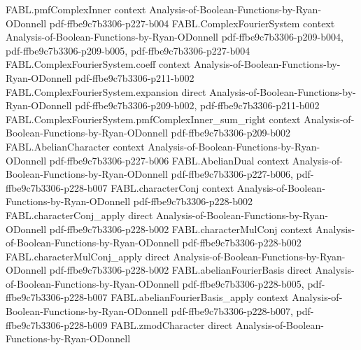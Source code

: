 \begin{theorem}
\label{FABL.ComplexFourierSystem.coeff_eq_inner}
\leanok
{}
\proofstep
  {FABL.pmfComplexInner}
  {context}
  {Analysis-of-Boolean-Functions-by-Ryan-ODonnell}
  {pdf-ffbe9c7b3306-p227-b004}
\proofstep
  {FABL.ComplexFourierSystem}
  {context}
  {Analysis-of-Boolean-Functions-by-Ryan-ODonnell}
  {pdf-ffbe9c7b3306-p209-b004,
    pdf-ffbe9c7b3306-p209-b005,
    pdf-ffbe9c7b3306-p227-b004}
\proofstep
  {FABL.ComplexFourierSystem.coeff}
  {context}
  {Analysis-of-Boolean-Functions-by-Ryan-ODonnell}
  {pdf-ffbe9c7b3306-p211-b002}
\proofstep
  {FABL.ComplexFourierSystem.expansion}
  {direct}
  {Analysis-of-Boolean-Functions-by-Ryan-ODonnell}
  {pdf-ffbe9c7b3306-p209-b002,
    pdf-ffbe9c7b3306-p211-b002}
\proofstep
  {FABL.ComplexFourierSystem.pmfComplexInner_sum_right}
  {context}
  {Analysis-of-Boolean-Functions-by-Ryan-ODonnell}
  {pdf-ffbe9c7b3306-p209-b002}
\proofstep
  {FABL.AbelianCharacter}
  {context}
  {Analysis-of-Boolean-Functions-by-Ryan-ODonnell}
  {pdf-ffbe9c7b3306-p227-b006}
\proofstep
  {FABL.AbelianDual}
  {context}
  {Analysis-of-Boolean-Functions-by-Ryan-ODonnell}
  {pdf-ffbe9c7b3306-p227-b006,
    pdf-ffbe9c7b3306-p228-b007}
\proofstep
  {FABL.characterConj}
  {context}
  {Analysis-of-Boolean-Functions-by-Ryan-ODonnell}
  {pdf-ffbe9c7b3306-p228-b002}
\proofstep
  {FABL.characterConj_apply}
  {direct}
  {Analysis-of-Boolean-Functions-by-Ryan-ODonnell}
  {pdf-ffbe9c7b3306-p228-b002}
\proofstep
  {FABL.characterMulConj}
  {context}
  {Analysis-of-Boolean-Functions-by-Ryan-ODonnell}
  {pdf-ffbe9c7b3306-p228-b002}
\proofstep
  {FABL.characterMulConj_apply}
  {direct}
  {Analysis-of-Boolean-Functions-by-Ryan-ODonnell}
  {pdf-ffbe9c7b3306-p228-b002}
\proofstep
  {FABL.abelianFourierBasis}
  {direct}
  {Analysis-of-Boolean-Functions-by-Ryan-ODonnell}
  {pdf-ffbe9c7b3306-p228-b005,
    pdf-ffbe9c7b3306-p228-b007}
\proofstep
  {FABL.abelianFourierBasis_apply}
  {context}
  {Analysis-of-Boolean-Functions-by-Ryan-ODonnell}
  {pdf-ffbe9c7b3306-p228-b007,
    pdf-ffbe9c7b3306-p228-b009}
\proofstep
  {FABL.zmodCharacter}
  {direct}
  {Analysis-of-Boolean-Functions-by-Ryan-ODonnell}

\end{theorem}
